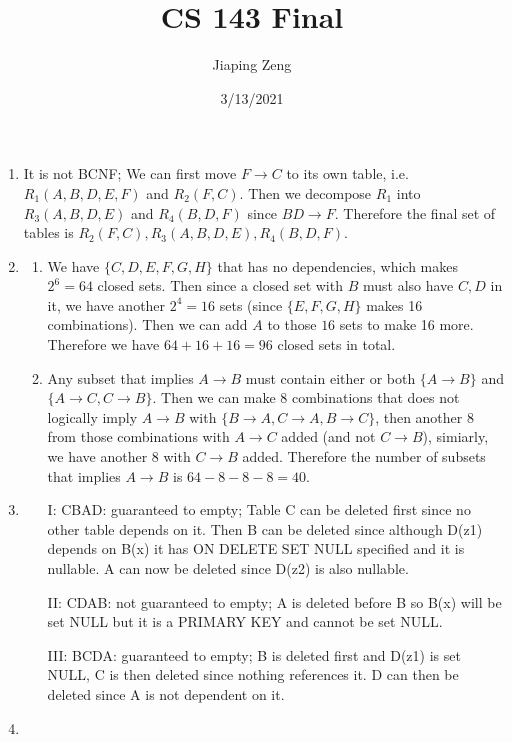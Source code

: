 \documentclass{article}
\title{CS 143 Final}
\date{3/13/2021}
\author{Jiaping Zeng}
\begin{document}

\begin{enumerate}
      \item It is not BCNF; We can first move $F\rightarrow C$ to its own table, i.e. $R_1(A,B,D,E,F)$ and $R_2(F,C)$. Then we decompose $R_1$ into $R_3(A,B,D,E)$ and $R_4(B,D,F)$ since $BD\rightarrow F$. Therefore the final set of tables is $R_2(F,C),R_3(A,B,D,E),R_4(B,D,F)$.
      \item
            \begin{enumerate}
                  \item We have $\{C,D,E,F,G,H\}$ that has no dependencies, which makes $2^6=64$ closed sets. Then since a closed set with $B$ must also have $C,D$ in it, we have another $2^4=16$ sets (since $\{E,F,G,H\}$ makes 16 combinations). Then we can add $A$ to those $16$ sets to make 16 more. Therefore we have $64+16+16=96$ closed sets in total.
                  \item Any subset that implies $A\rightarrow B$ must contain either or both $\{A\rightarrow B\}$ and $\{A\rightarrow C,C\rightarrow B\}$. Then we can make 8 combinations that does not logically imply $A\rightarrow B$ with $\{B\rightarrow A,C\rightarrow A,B\rightarrow C\}$, then another 8 from those combinations with $A\rightarrow C$ added (and not $C\rightarrow B$), simiarly, we have another 8 with $C\rightarrow B$ added. Therefore the number of subsets that implies $A\rightarrow B$ is $64-8-8-8=40$.
            \end{enumerate}
      \item
            \begin{itemize}
                  \item [I:] CBAD: guaranteed to empty; Table C can be deleted first since no other table depends on it. Then B can be deleted since although D(z1) depends on B(x) it has ON DELETE SET NULL specified and it is nullable. A can now be deleted since D(z2) is also nullable.
                  \item [II:] CDAB: not guaranteed to empty; A is deleted before B so B(x) will be set NULL but it is a PRIMARY KEY and cannot be set NULL.
                  \item [III:] BCDA: guaranteed to empty; B is deleted first and D(z1) is set NULL, C is then deleted since nothing references it. D can then be deleted since A is not dependent on it.
            \end{itemize}
      \item
            \begin{enumerate}

\end{enumerate}
\end{enumerate}
\end{document}
